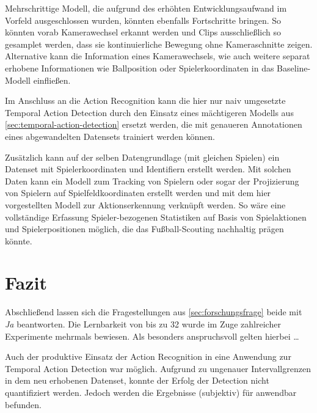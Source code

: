 Mehrschrittige Modell, die aufgrund des erhöhten Entwicklungsaufwand im Vorfeld ausgeschlossen wurden, könnten ebenfalls Fortschritte bringen.
So könnten \zB vorab Kamerawechsel erkannt werden und Clips ausschließlich so gesamplet werden, dass sie kontinuierliche Bewegung ohne Kameraschnitte zeigen.
Alternative kann die Information eines Kamerawechsels, wie auch weitere separat erhobene Informationen wie Ballposition oder Spielerkoordinaten in das Baseline-Modell einfließen.

Im Anschluss an die Action Recognition kann die hier nur naiv umgesetzte Temporal Action Detection durch den Einsatz eines mächtigeren Modells aus \autoref{sec:temporal-action-detection} ersetzt werden, die mit genaueren Annotationen eines abgewandelten Datensets trainiert werden können.

Zusätzlich kann auf der selben Datengrundlage (mit gleichen Spielen) ein Datenset mit Spielerkoordinaten und Identifiern erstellt werden.
Mit solchen Daten kann \ggf ein Modell zum Tracking von Spielern oder sogar der Projizierung von Spielern auf Spielfeldkoordinaten erstellt werden und mit dem hier vorgestellten Modell zur Aktionserkennung verknüpft werden.
So wäre eine vollständige Erfassung Spieler-bezogenen Statistiken auf Basis von Spielaktionen und Spielerpositionen möglich, die das Fußball-Scouting nachhaltig prägen könnte.

\section{Fazit}
\label{sec:fazit}

Abschließend lassen sich die Fragestellungen aus \autoref{sec:forschungsfrage} beide mit \emph{Ja} beantworten.
Die Lernbarkeit von bis zu 32 wurde im Zuge zahlreicher Experimente mehrmals bewiesen.
Als besonders anspruchsvoll gelten hierbei \dots


Auch der produktive Einsatz der Action Recognition in eine Anwendung zur Temporal Action Detection war möglich.
Aufgrund zu ungenauer Intervallgrenzen in dem neu erhobenen Datenset, konnte der Erfolg der Detection nicht quantifiziert werden.
Jedoch werden die Ergebnisse (subjektiv) für anwendbar befunden.
